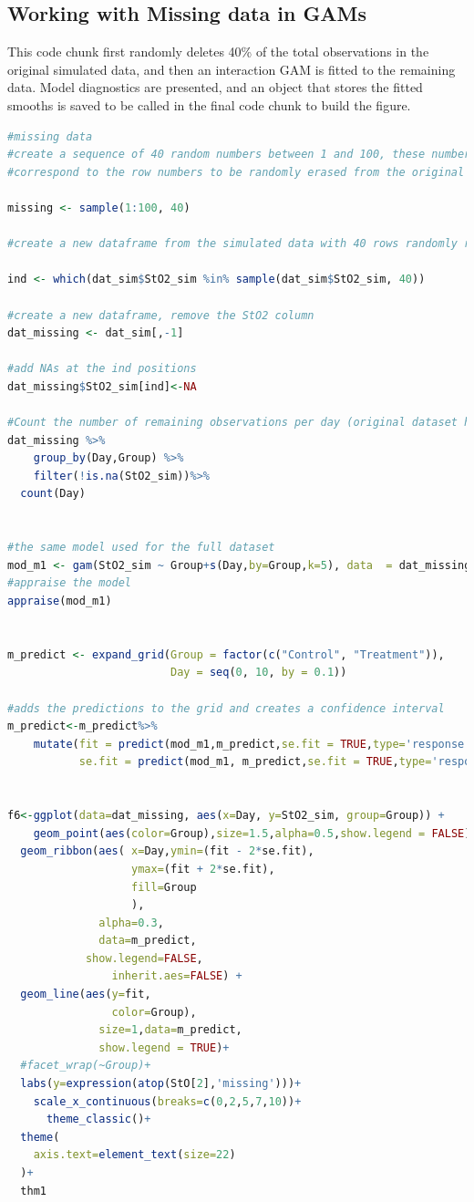 \documentclass[
]{article}
\begin{document}
\hypertarget{working-with-missing-data-in-gams}{%
\subsection{Working with Missing data in GAMs}\label{working-with-missing-data-in-gams}}

This code chunk first randomly deletes 40\% of the total observations in the original simulated data, and then an interaction GAM is fitted to the remaining data. Model diagnostics are presented, and an object that stores the fitted smooths is saved to be called in the final code chunk to build the figure.

\begin{lstlisting}[language=R]
#missing data
#create a sequence of 40 random numbers between 1 and 100, these numbers will
#correspond to the row numbers to be randomly erased from the original dataset

missing <- sample(1:100, 40)

#create a new dataframe from the simulated data with 40 rows randomly removed, keep the missing values as NA

ind <- which(dat_sim$StO2_sim %in% sample(dat_sim$StO2_sim, 40))

#create a new dataframe, remove the StO2 column
dat_missing <- dat_sim[,-1]

#add NAs at the ind positions
dat_missing$StO2_sim[ind]<-NA 

#Count the number of remaining observations per day (original dataset had 10 per group per day)
dat_missing %>%
    group_by(Day,Group) %>%
    filter(!is.na(StO2_sim))%>%
  count(Day)


#the same model used for the full dataset
mod_m1 <- gam(StO2_sim ~ Group+s(Day,by=Group,k=5), data  = dat_missing,family=scat)
#appraise the model
appraise(mod_m1)


m_predict <- expand_grid(Group = factor(c("Control", "Treatment")),
                         Day = seq(0, 10, by = 0.1))

#adds the predictions to the grid and creates a confidence interval
m_predict<-m_predict%>%
    mutate(fit = predict(mod_m1,m_predict,se.fit = TRUE,type='response')$fit,
           se.fit = predict(mod_m1, m_predict,se.fit = TRUE,type='response')$se.fit)


f6<-ggplot(data=dat_missing, aes(x=Day, y=StO2_sim, group=Group)) +
    geom_point(aes(color=Group),size=1.5,alpha=0.5,show.legend = FALSE)+
  geom_ribbon(aes( x=Day,ymin=(fit - 2*se.fit), 
                   ymax=(fit + 2*se.fit),
                   fill=Group
                   ),
              alpha=0.3,
              data=m_predict,
            show.legend=FALSE,
                inherit.aes=FALSE) +
  geom_line(aes(y=fit,
                color=Group),
              size=1,data=m_predict,
              show.legend = TRUE)+
  #facet_wrap(~Group)+
  labs(y=expression(atop(StO[2],'missing')))+
    scale_x_continuous(breaks=c(0,2,5,7,10))+
      theme_classic()+
  theme(
    axis.text=element_text(size=22)
  )+
  thm1
\end{lstlisting}
\end{document}

